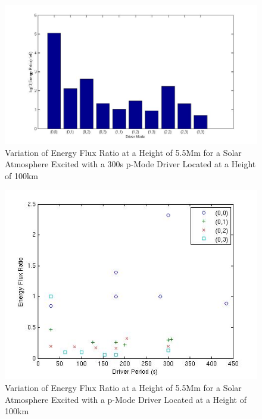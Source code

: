 \documentclass[final,1p]{elsarticle}
\begin{document}
\begin{figure}[h]
\includegraphics[scale=0.6]{imagesn/ratio_varoverdrve_eflux_vperiod_forallmodes_300s_5p5Mm.jpg}
\caption{Variation of Energy Flux Ratio at a Height of 5.5Mm for a Solar Atmosphere Excited with a 300s p-Mode Driver Located at a Height of 100km}
\end{figure}


\begin{figure}[h]
\includegraphics[scale=0.6]{imagesn/ratio_varoverconst_eflux_vperiod_for modes_5p5Mm.jpg}
\caption{Variation of Energy Flux Ratio at a Height of 5.5Mm for a Solar Atmosphere Excited with a p-Mode Driver Located at a Height of 100km}
\end{figure}
\end{document}
